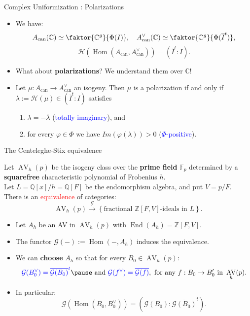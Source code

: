 \documentclass[usenames,dvipsnames,handout]{beamer}
\def\Q{\mathbb{Q}}
\def\Z{\mathbb{Z}}
\def\C{\mathbb{C}}
\def\F{\mathbb{F}}
\DeclareMathOperator{\AV}{AV}
\DeclareMathOperator{\Hom}{Hom}
\DeclareMathOperator{\End}{End}
\newcommand{\cG}{\mathcal{G}}
\newcommand{\cH}{{\mathcal H}}
\newcommand{\vphi}{\varphi}
\newcommand{\set}[1]{\left\lbrace#1\right\rbrace }
\newcommand{\AcanC}{A_{\mathrm{can}}}
\newcommand{\red}[1]{\textcolor{red}{#1}}
\newcommand{\blue}[1]{\textcolor{blue}{#1}}
\begin{document}
\begin{frame}{ Complex Uniformization : Polarizations }
    \begin{itemize}
    \item We have: 
    \[ \AcanC(\C) \simeq \faktor{\C^g}{\Phi(I)}, \quad \AcanC^\vee(\C) \simeq \faktor{\C^g}{\Phi(\overline{I}^t)},\]
    \[ \cH(\Hom(\AcanC,\AcanC^\vee)) = (\overline{I}^t:I). \]
\pause         
    \item What about {\bf polarizations}? We understand them over $\C$!
\pause    
    \item Let $\mu:\AcanC\to \AcanC^\vee$ an isogeny. Then $\mu$ is a polarization if and only if
	       $\lambda := \cH(\mu) \in (\overline{I}^t:I)$ satisfies
	       \begin{enumerate}
\pause 
	       \item $\lambda = - \overline{\lambda}$ (\blue{totally imaginary}), and
\pause 
	       \item for every $\vphi\in \Phi$ we have $Im(\vphi(\lambda))>0$  (\blue{$\Phi$-positive}).
           \end{enumerate}
\pause            	  
	\end{itemize}
\end{frame}

\begin{frame}{ The Centeleghe-Stix equivalence }
\pause 
    \begin{theorem}
    Let $\AV_h(p)$ be the isogeny class over the {\bf prime field} $\F_p$ determined by a {\bf squarefree} characteristic polynomial of Frobenius $h$.\\
    Let $L=\Q[x]/h=\Q[F]$ be the endomorphism algebra, and put $V=p/F$.\\
\pause 
    There is an \red{equivalence} of categories:
    \[ \AV_h(p) \overset{\cG}{\longrightarrow} \set{\text{fractional $\Z[F,V]$-ideals in $L$}}.  \]
    \end{theorem}
	\begin{itemize}
\pause 
    \item Let $A_h$ be an AV in $\AV_h(p)$ with $\End(A_h)=\Z[F,V]$.
\pause 
    \item The functor $\cG(-):=\Hom(-,A_h)$ induces the equivalence.
\pause 
    \item We can {\bf choose} $A_h$ so that for every $B_0\in \AV_h(p)$:
    \[ \blue{\cG(B_0^\vee) = \overline{\cG(B_0)}^t}
\pause    
     \text{ and } \blue{\cG(f^\vee) = \overline{\cG(f)}}, \text{ for any }f: B_0\to B_0' \text{ in }\AV_h(p). \]
\pause
    \vspace{-0.8cm}     
    \item In particular:
    \vspace{-0.5cm}    
    \[ \cG(\Hom(B_0,B_0^\vee)) = (\cG(B_0):\overline{\cG(B_0)}^t). \]
	\end{itemize}
\end{frame}
\end{document}
